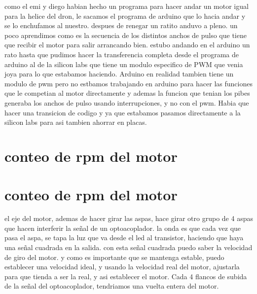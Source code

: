 \documentclass[a4paper]{article}
\begin{document}
como el emi y diego habian hecho un programa para hacer andar un motor igual para la helice del dron, le sacamos el programa de arduino que lo hacia andar y se lo enchufamos al nuestro. despues de renegar un ratito anduvo a pleno. un poco aprendimos como es la secuencia de los distintos anchos de pulso que tiene que recibir el motor para salir arrancando bien. estubo andando en el arduino un rato hasta que pudimos hacer la transferencia completa desde el programa de arduino al de la silicon labs que tiene un modulo especifico de PWM que venia joya para lo que estabamos haciendo. Arduino en realidad tambien tiene un modulo de pwm pero no estbamos trabajando en arduino para hacer las funciones que le competian al motor directamente y ademas la funcion que tenian los pibes generaba los anchos de pulso usando interrupciones, y no con el pwm. Habia que hacer una transicion de codigo y ya que estabamos pasamos directamente a la silicon labs para asi tambien ahorrar en placas.

\section*{conteo de rpm del motor}
\section{conteo de rpm del motor} %
\label{sec:conteo_de_rpm_del_motor}

el eje del motor, ademas de hacer girar las aspas, hace girar otro grupo de 4 aspas que hacen interferir la señal de un optoacoplador. la onda es que cada vez que pasa el aspa, se tapa la luz que va desde el led al transistor, haciendo que haya una señal cuadrada en la salida. con esta señal cuadrada puedo saber la velocidad de giro del motor. y como es importante que se mantenga estable, puedo establecer una velocidad ideal, y usando la velocidad real del motor, ajustarla para que tienda a ser la real, y asi establecer el motor. Cada 4 flancos de subida de la señal del optoacoplador, tendriamos una vuelta entera del motor.
\end{document}

